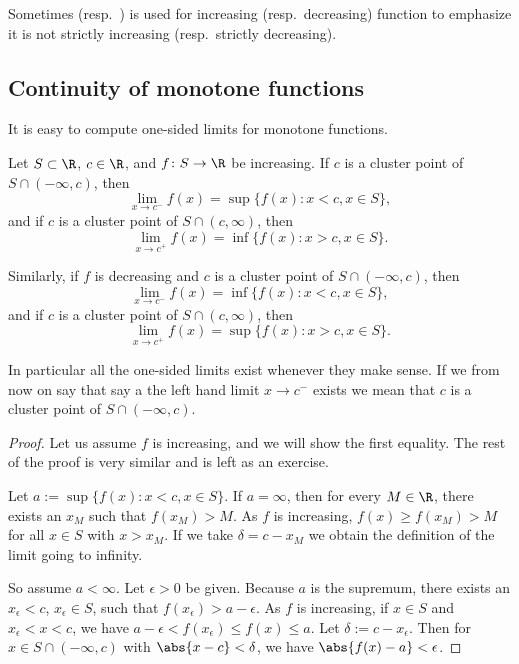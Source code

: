 \documentclass[12pt]{book}
\begin{document}
Sometimes \emph{}
(resp.\ \emph{}) is used
for increasing (resp.\ decreasing) function to emphasize it is not
strictly increasing (resp.\ strictly decreasing).

\subsection*{Continuity of monotone functions}

It is easy to compute one-sided limits for monotone functions.

\begin{prop} \label{prop:monotlimits}
Let $S \subset \R$, $c \in \R$, and $f \colon S \to \R$ be increasing.
If $c$ is a cluster point of $S \cap (-\infty,c)$, then
\begin{equation*}
\lim_{x \to c^-} f(x) = \sup \{ f(x) : x < c, x \in S \} ,
\end{equation*}
and if $c$ is a cluster point of $S \cap (c,\infty)$, then
\begin{equation*}
\lim_{x \to c^+} f(x) = \inf \{ f(x) : x > c, x \in S \} .
\end{equation*}

Similarly, if $f$ is decreasing and
$c$ is a cluster point of $S \cap (-\infty,c)$, then
\begin{equation*}
\lim_{x \to c^-} f(x) = \inf \{ f(x) : x < c, x \in S \} ,
\end{equation*}
and if $c$ is a cluster point of $S \cap (c,\infty)$, then
\begin{equation*}
\lim_{x \to c^+} f(x) = \sup \{ f(x) : x > c, x \in S \} .
\end{equation*}
\end{prop}

In particular all the one-sided limits exist whenever they make
sense.
If we from now on say that say a the left hand limit $x \to c^-$
exists we mean that $c$ is a cluster point of $S \cap (-\infty,c)$.

\begin{proof}
Let us assume $f$ is increasing, and we will show the first
equality.
The rest of the proof is very similar and is left as an
exercise.

Let $a := \sup \{ f(x) : x < c, x \in S \}$.
If $a = \infty$,
then for every $M \in \R$, there exists an $x_M$ such that $f(x_M) > M$. 
As $f$ is increasing, $f(x) \geq f(x_M) >  M$ for all $x \in S$ with $x > x_M$.
If
we take $\delta = c-x_M$ we obtain the definition of the limit going to
infinity.

So assume $a < \infty$.
Let $\epsilon > 0$ be given.
Because $a$ is the supremum,
there exists an $x_\epsilon < c$,
$x_\epsilon \in S$,
such that $f(x_\epsilon) > a-\epsilon$.
As $f$ is increasing,
if $x \in S$ and $x_\epsilon < x < c$, we have
$a-\epsilon < f(x_\epsilon) \leq f(x) \leq a$.
Let
$\delta := c-x_\epsilon$.
Then for $x \in S \cap (-\infty,c)$
with $\abs{x-c} < \delta$,
we have $\abs{f(x)-a} < \epsilon$.
\end{proof}
\end{document}
